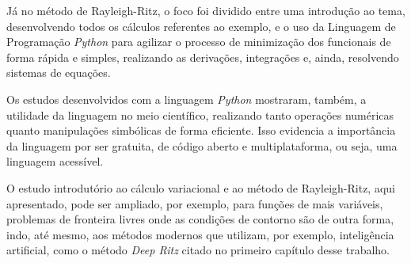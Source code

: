 \documentclass[
	12pt,				%
	openright,			%
    twoside,			%
	a4paper,			%
	chapter=TITLE,		%
	english,			%
	french,				%
	spanish,			%
	brazil				%
	]{abntex2}
\numberwithin{lema}{chapter}
\numberwithin{teorema}{chapter}
\numberwithin{definicao}{chapter}
\numberwithin{exemplo}{chapter}
\numberwithin{figure}{chapter}
\begin{document}
Já no método de Rayleigh-Ritz, o foco foi dividido entre uma introdução ao tema, desenvolvendo todos os cálculos referentes ao exemplo, e o uso da Linguagem de Programação \textit{Python} para agilizar o processo de minimização dos funcionais de forma rápida e simples, realizando as derivações, integrações e, ainda, resolvendo sistemas de equações.

Os estudos desenvolvidos com a linguagem \textit{Python} mostraram, também, a utilidade da linguagem no meio científico, realizando tanto operações numéricas quanto manipulações simbólicas de forma eficiente. Isso evidencia a importância da linguagem por ser gratuita, de código aberto e multiplataforma, ou seja, uma linguagem acessível.

O estudo introdutório ao cálculo variacional e ao método de Rayleigh-Ritz, aqui apresentado, pode ser ampliado, por exemplo, para funções de mais variáveis, problemas de fronteira livres onde as condições de contorno são de outra forma, indo, até mesmo, aos métodos modernos que utilizam, por exemplo, inteligência artificial, como o método \textit{Deep Ritz} citado no primeiro capítulo desse trabalho.

\postextual



\end{document}
